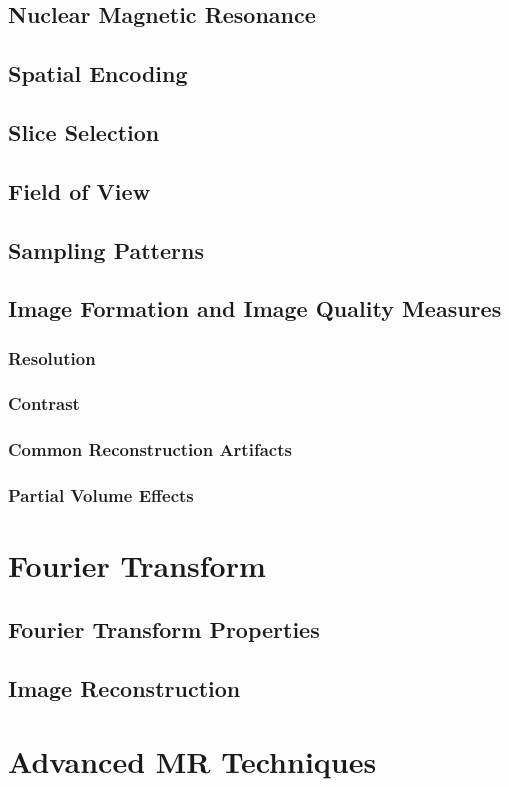 \documentclass{book}
\begin{document}
				\section{Nuclear Magnetic Resonance}
				\section{Spatial Encoding}
				\section{Slice Selection}
				\section{Field of View}
				\section{Sampling Patterns}
				\section{Image Formation and Image Quality Measures}
					\subsection{Resolution}
					\subsection{Contrast}
					\subsection{Common Reconstruction Artifacts}
					\subsection{Partial Volume Effects}
			\chapter{Fourier Transform}
				\section{Fourier Transform Properties}
				\section{Image Reconstruction}
			\chapter{Advanced MR Techniques}
\end{document}
